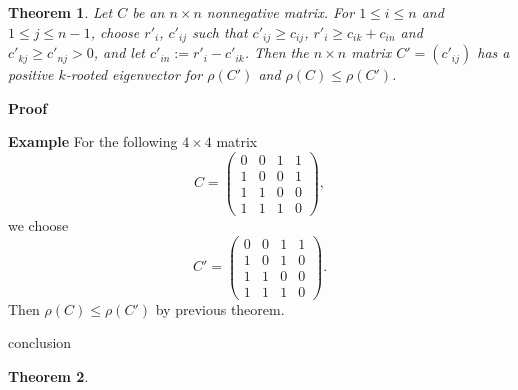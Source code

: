 \documentclass{beamer}
\theoremstyle{plain}
\newtheorem{thm}{Theorem}[section]
\theoremstyle{definition}
\begin{document}
\begin{frame}

\begin{thm}
Let $C$ be an $n\times n$ nonnegative matrix. For $1\leq i \leq n$ and $1\leq j\leq n-1$, choose $r'_i$, $c'_{ij}$
such that $c'_{ij}\geq c_{ij}$, $r'_i\geq c_{ik}+c_{in}$ and $c'_{kj}\geq c'_{nj}>0$, and 
let $c'_{in}:=r'_i-c'_{ik}$. Then the $n\times n$ matrix $C'=(c'_{ij})$ has a positive $k$-rooted eigenvector for $\rho(C')$ and $\rho(C)\leq \rho(C')$. 
\end{thm}

\end{frame}

\begin{frame}{\bf Proof}



\end{frame}


\begin{frame}{\bf Example}
For the following $4\times 4$ matrix  
$$C=\begin{pmatrix}
0 & 0 & 1 & 1\\ 
1 & 0 & 0 & 1\\ 
1 & 1 & 0 & 0\\ 
1 & 1 & 1 & 0
\end{pmatrix},$$ 
we choose  
$$C'=\begin{pmatrix}
0 & 0 & 1 & 1\\
1 & 0 & 1 &  0\\
1 & 1 & 0 & 0\\
1 & 1 & 1 & 0
\end{pmatrix}.$$ 
Then 
$\rho(C)\leq \rho(C')$ by previous theorem. 
\end{frame}



\begin{frame}{conclusion}
    \begin{thm}
    \end{thm}
\end{frame}
\end{document}
